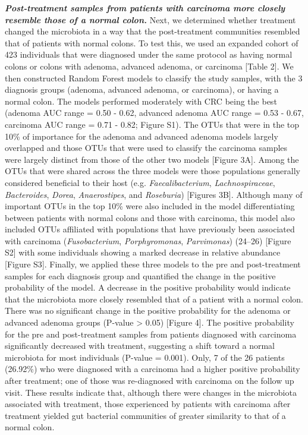 \documentclass[12pt,]{article}
\begin{document}
\textbf{\emph{Post-treatment samples from patients with carcinoma more
closely resemble those of a normal colon.}} Next, we determined whether
treatment changed the microbiota in a way that the post-treatment
communities resembled that of patients with normal colons. To test this,
we used an expanded cohort of 423 individuals that were diagnosed under
the same protocol as having normal colons or colons with adenoma,
advanced adenoma, or carcinoma {[}Table 2{]}. We then constructed Random
Forest models to classify the study samples, with the 3 diagnosis groups
(adenoma, advanced adenoma, or carcinoma), or having a normal colon. The
models performed moderately with CRC being the best (adenoma AUC range =
0.50 - 0.62, advanced adenoma AUC range = 0.53 - 0.67, carcinoma AUC
range = 0.71 - 0.82; Figure S1). The OTUs that were in the top 10\% of
importance for the adenoma and advanced adenoma models largely
overlapped and those OTUs that were used to classify the carcinoma
samples were largely distinct from those of the other two models
{[}Figure 3A{]}. Among the OTUs that were shared across the three models
were those populations generally considered beneficial to their host
(e.g. \emph{Faecalibacterium}, \emph{Lachnospiraceae},
\emph{Bacteroides}, \emph{Dorea}, \emph{Anaerostipes}, and
\emph{Roseburia}) {[}Figures 3B{]}. Although many of important OTUs in
the top 10\% were also included in the model differentiating between
patients with normal colons and those with carcinoma, this model also
included OTUs affiliated with populations that have previously been
associated with carcinoma (\emph{Fusobacterium}, \emph{Porphyromonas},
\emph{Parvimonas}) (24--26) {[}Figure S2{]} with some individuals
showing a marked decrease in relative abundance {[}Figure S3{]}.
Finally, we applied these three models to the pre and post-treatment
samples for each diagnosis group and quantified the change in the
positive probability of the model. A decrease in the positive
probability would indicate that the microbiota more closely resembled
that of a patient with a normal colon. There was no significant change
in the positive probability for the adenoma or advanced adenoma groups
(P-value \textgreater{} 0.05) {[}Figure 4{]}. The positive probability
for the pre and post-treatment samples from patients diagnosed with
carcinoma significantly decreased with treatment, suggesting a shift
toward a normal microbiota for most individuals (P-value = 0.001). Only,
7 of the 26 patients (26.92\%) who were diagnosed with a carcinoma had a
higher positive probability after treatment; one of those was
re-diagnosed with carcinoma on the follow up visit. These results
indicate that, although there were changes in the microbiota associated
with treatment, those experienced by patients with carcinoma after
treatment yielded gut bacterial communities of greater similarity to
that of a normal colon.
\end{document}
